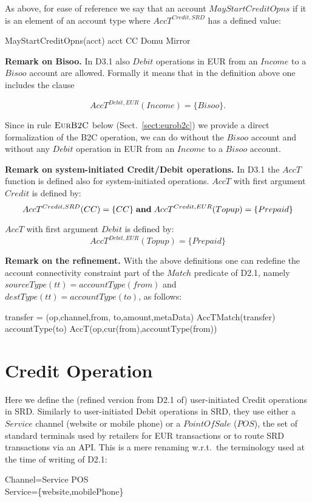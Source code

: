  As above, for ease of reference we say that an account $MayStartCreditOpns$ if it is an element of an account type where $AccT^{Credit,SRD}$ has a defined value: 
\begin{asm}
MayStartCreditOpns(acct) \IFF acct \in CC \cup Domu \cup Mirror 
\end{asm}


\bigskip
{\bf Remark on Bisoo.}
In D3.1 also $Debit$ operations in EUR from an $Income$ to a $Bisoo$ account are allowed. 
Formally it means that in the definition above one includes the clause

\[AccT^{Debit,EUR}(Income) =\{Bisoo\}.\] 

Since in rule $\hbox{\sc EurB2C}$ below (Sect.~\ref{sect:eurob2c}) we provide a direct formalization of the B2C operation, we can do without the $Bisoo$ account and without any $Debit$ operation in EUR from an $Income$ to a $Bisoo$ account.

\bigskip
{\bf Remark on system-initiated Credit/Debit operations.} In D3.1 the $AccT$ function is defined also for system-initiated operations. $AccT$ with first argument $Credit$ is defined by:
\[AccT^{Credit,SRD}(CC)=\{CC\} \mathrel{\mathbf{and}} AccT^{Credit,EUR}(Topup)=\{Prepaid\} \]

$AccT$ with first argument $Debit$ is defined by:
\[AccT^{Debit,EUR}(Topup)=\{Prepaid\}\]

\bigskip
{\bf Remark on the refinement.} With the above definitions one can redefine the account connectivity constraint part of the $Match$ predicate of D2.1, namely $sourceType(tt)=accountType(from)$ and $destType(tt)=accountType(to)$, as follows:

\begin{asm}
\LET transfer = (op,channel,from, to,amount,metaData) \+
AccTMatch(transfer) \IFF ~~   accountType(to) \in AccT(op,cur(from),accountType(from))
\end{asm}

\section{Credit Operation} 
\label{sect:creditops}

Here we define the (refined version from D2.1 of) user-initiated Credit operations in SRD. Similarly to user-initiated Debit operations in SRD, they use either a $Service$ channel (website or mobile phone) or a $PointOfSale$ ($POS$), the set of standard terminals used by retailers for EUR transactions or to route SRD transactions via an API. This is a mere renaming w.r.t.\ the terminology used at the time of writing of D2.1:
\begin{asm}
Channel=Service \cup POS \\
Service=\{website,mobilePhone\}
\end{asm}

